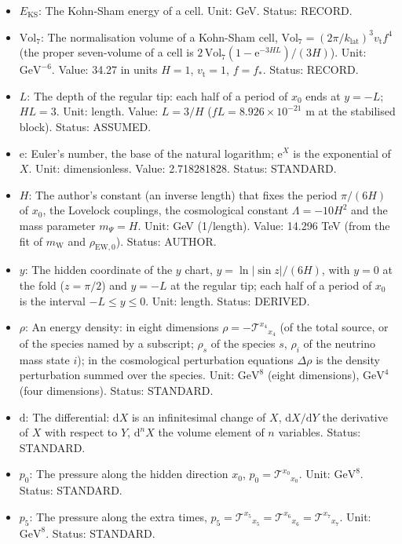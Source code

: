 \documentclass[
  10pt,
]{article}
\providecommand{\tightlist}{%
  \setlength{\itemsep}{0pt}\setlength{\parskip}{0pt}}
\begin{document}
\begin{itemize}
\tightlist
\item
  \(E_{\mathrm{KS}}\): The Kohn-Sham energy of a cell. Unit: GeV.
  Status: RECORD.
\item
  \(\mathrm{Vol}_7\): The normalisation volume of a Kohn-Sham cell,
  \(\mathrm{Vol}_7 = (2\pi/k_{\mathrm{lat}})^3v_{\mathrm{t}}f^4\) (the
  proper seven-volume of a cell is
  \(2\,\mathrm{Vol}_7(1 - \mathrm{e}^{-3HL})/(3H)\)). Unit:
  \(\mathrm{GeV}^{-6}\). Value: 34.27 in units \(H = 1\),
  \(v_{\mathrm{t}} = 1\), \(f = f_*\). Status: RECORD.
\item
  \(L\): The depth of the regular tip: each half of a period of \(x_0\)
  ends at \(y = -L\); \(HL = 3\). Unit: length. Value: \(L = 3/H\)
  (\(fL = 8.926\times10^{-21}\) m at the stabilised block). Status:
  ASSUMED.
\item
  \(\mathrm{e}\): Euler's number, the base of the natural logarithm;
  \(\mathrm{e}^{X}\) is the exponential of \(X\). Unit: dimensionless.
  Value: 2.718281828. Status: STANDARD.
\item
  \(H\): The author's constant (an inverse length) that fixes the period
  \(\pi/(6H)\) of \(x_0\), the Lovelock couplings, the cosmological
  constant \(\Lambda = -10H^2\) and the mass parameter \(m_\Psi = H\).
  Unit: GeV (1/length). Value: 14.296 TeV (from the fit of
  \(m_{\mathrm{W}}\) and \(\rho_{\mathrm{EW},0}\)). Status: AUTHOR.
\item
  \(y\): The hidden coordinate of the \(y\) chart,
  \(y = \ln\lvert\sin z\rvert/(6H)\), with \(y = 0\) at the fold
  (\(z = \pi/2\)) and \(y = -L\) at the regular tip; each half of a
  period of \(x_0\) is the interval \(-L \le y \le 0\). Unit: length.
  Status: DERIVED.
\item
  \(\rho\): An energy density: in eight dimensions
  \(\rho = -\mathcal{T}^{x_4}{}_{x_4}\) (of the total source, or of the
  species named by a subscript; \(\rho_s\) of the species \(s\),
  \(\rho_i\) of the neutrino mass state \(i\)); in the cosmological
  perturbation equations \(\Delta\rho\) is the density perturbation
  summed over the species. Unit: \(\mathrm{GeV}^{8}\) (eight
  dimensions), \(\mathrm{GeV}^{4}\) (four dimensions). Status: STANDARD.
\item
  \(\mathrm{d}\): The differential: \(\mathrm{d}X\) is an infinitesimal
  change of \(X\), \(\mathrm{d}X/\mathrm{d}Y\) the derivative of \(X\)
  with respect to \(Y\), \(\mathrm{d}^nX\) the volume element of \(n\)
  variables. Status: STANDARD.
\item
  \(p_0\): The pressure along the hidden direction \(x_0\),
  \(p_0 = \mathcal{T}^{x_0}{}_{x_0}\). Unit: \(\mathrm{GeV}^{8}\).
  Status: STANDARD.
\item
  \(p_5\): The pressure along the extra times,
  \(p_5 = \mathcal{T}^{x_5}{}_{x_5} = \mathcal{T}^{x_6}{}_{x_6} = \mathcal{T}^{x_7}{}_{x_7}\).
  Unit: \(\mathrm{GeV}^{8}\). Status: STANDARD.
\end{itemize}
\end{document}
